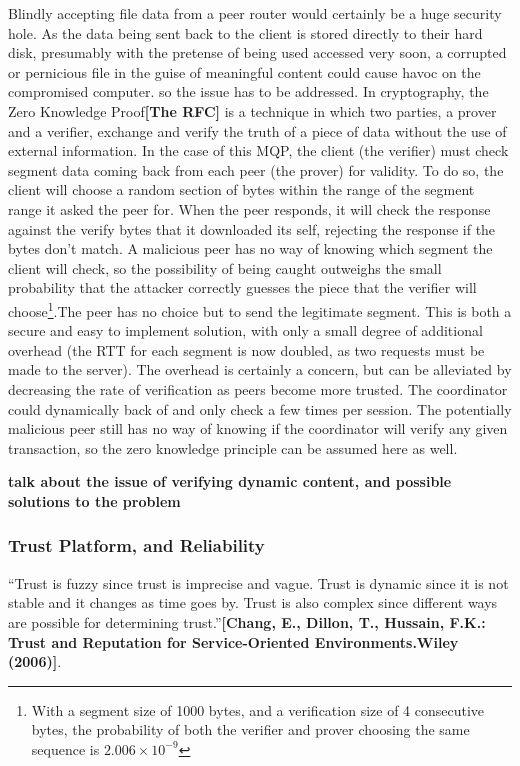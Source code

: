 \documentclass[12pt]{article}
\newcommand{\comment}[1]
{{\bfseries \color{blue} #1}}
\newcommand{\lcite}[1]
{{\bfseries\color{orange}[#1]}}
\begin{document}
		Blindly accepting file data from a peer router would certainly be a huge security hole. As the data being sent back to the client is stored directly to their hard disk, presumably with the pretense of being used accessed very soon, a corrupted or pernicious file in the guise of meaningful content could cause havoc on the compromised computer. so the issue has to be addressed. In cryptography, the Zero Knowledge Proof\lcite{The RFC} is a technique in which two parties, a prover and a verifier, exchange and verify the truth of a piece of data without the use of external information. In the case of this MQP, the client (the verifier) must check segment data coming back from each peer (the prover) for validity. To do so, the client will choose a random section of bytes within the range of the segment range it asked the peer for. When the peer responds, it will check the response against the verify bytes that it downloaded its self, rejecting the response if the bytes don't match. A malicious peer has no way of knowing which segment the client will check, so the possibility of being caught outweighs the small probability that the attacker correctly guesses the piece that the verifier will choose\footnote{With a segment size of 1000 bytes, and a verification size of 4 consecutive bytes, the probability of both the verifier and prover choosing the same sequence is $2.006\times10^{-9}$}.The peer has no choice but to send the legitimate segment. This is both a secure and easy to implement solution, with only a small degree of additional overhead (the RTT for each segment is now doubled, as two requests must be made to the server). The overhead is certainly a concern, but can be alleviated by decreasing the rate of verification as peers become more trusted. The coordinator could dynamically back of and only check a few times per session. The potentially malicious peer still has no way of knowing if the coordinator will verify any given transaction, so the zero knowledge principle can be assumed here as well.

		\comment{talk about the issue of verifying dynamic content, and possible solutions to the problem}

		\subsubsection{Trust Platform, and Reliability}

			``Trust is fuzzy since trust is imprecise and vague. Trust is dynamic since it is not stable and it changes as time goes by. Trust is also complex since different ways are possible for determining trust.''\lcite{Chang, E., Dillon, T., Hussain, F.K.: Trust and Reputation for Service-Oriented Environments.Wiley (2006)}. 
\end{document}
